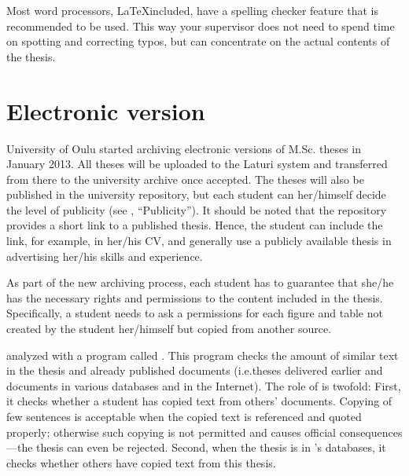 Most word processors, \LaTeX\DIFaddbegin \DIFadd{\ }\DIFaddend included, have a spelling checker
feature that is recommended to be used. This way your supervisor does
not need to spend time on spotting and correcting typos, but can
concentrate on the actual contents of the thesis.

\section{Electronic version}

University of Oulu started archiving electronic versions of M.Sc.
theses in January 2013. All theses will be uploaded to the Laturi
system and transferred from there to the university archive once
accepted. The theses will also be published in the university
repository, but each student can her/himself decide the level of
publicity (see , “Publicity”). It should be
noted that the repository provides a short link to a published
thesis. Hence, the student can include the link, for example, in
her/his CV, and generally use a publicly available thesis in
advertising her/his skills and experience.

As part of the new archiving process, each student has to guarantee
that she/he has the necessary rights and permissions to the content
included in the thesis. Specifically, a student needs to ask a
permissions for each figure and table not created by the student
her/himself but copied from another source.

\DIFdelbegin {}\DIFdelend \DIFaddbegin {}\DIFaddend analyzed with a program called \DIFdelbegin {}\DIFdelend \DIFaddbegin {}\DIFaddend . This program checks the
amount of similar text in the thesis and already published documents
(i.e.\DIFaddbegin \DIFadd{, }\DIFaddend theses delivered earlier and documents in various databases and
in the Internet). The role of \DIFdelbegin {}\DIFdelend \DIFaddbegin {}\DIFaddend is twofold: First, it checks
whether a student has copied text from others’ documents. Copying of
few sentences is acceptable when the copied text is referenced and
quoted properly; otherwise such copying is not permitted and causes
official consequences---the thesis can even be rejected. Second, when
the thesis is in \DIFdelbegin {}\DIFdelend \DIFaddbegin {}\DIFaddend ’s databases, it checks whether others have
copied text from this thesis.

